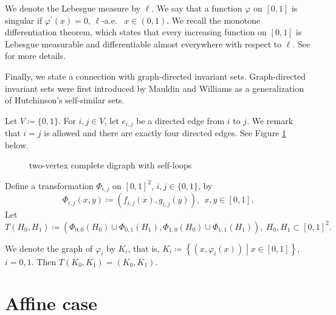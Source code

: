 \documentclass[a4paper, reqno, 11pt]{amsart}
\theoremstyle{definition}
\begin{document}
We denote the Lebesgue measure by $\ell$. 
We say that a function $\varphi$ on $[0,1]$ is singular if $\varphi^{\prime}(x) = 0$, $\ell$-a.e. \, $x \in (0,1)$.  
We recall the monotone differentiation theorem, which states that every increasing function on $[0,1]$ is Lebesgue measurable and differentiable almost everywhere with respect to $\ell$. 
See \cite[Theorem 1.6.25]{Tao2011}  for more details. 



Finally, we state a connection with graph-directed invariant sets. 
Graph-directed invariant sets were first introduced by Mauldin and Williams \cite{MauldinWilliams1988} as a generalization of Hutchinson's self-similar sets. 

Let $V \coloneqq \{0,1\}$. 
For $i, j \in V$, 
let $e_{i,j}$ be a directed edge from $i$ to $j$. 
We remark that $i=j$ is allowed and there are exactly four directed edges. 
See Figure \ref{fig:digraph} below. 

\begin{figure}[H]
\centering
{}
\caption{two-vertex complete digraph with self-loops}\label{fig:digraph}
\end{figure}


Define a transformation $\Phi_{i,j}$ on $[0,1]^2$, $i, j \in \{0,1\}$,  by 
\[ \Phi_{i,j}(x,y) \coloneqq (f_{i,j}(x), g_{i,j}(y)), \ \ x, y \in [0,1].  \] 
Let 
\begin{equation*}
T(H_0, H_1) \coloneqq \left(  \Phi_{0,0}(H_0) \cup  \Phi_{0,1}(H_1), \Phi_{1,0}(H_0) \cup  \Phi_{1,1}(H_1)  \right), \ H_0, H_1 \subset [0,1]^2. 
\end{equation*}


We denote the graph of $\varphi_i$ by $K_i$, that is, $K_i \coloneqq \left\{(x, \varphi_i (x)) \middle| x \in [0,1] \right\}$, $i = 0,1$. 
Then $T(K_0, K_1) = (K_0, K_1)$. 



\section{Affine case}\label{sec:affine}
\end{document}
